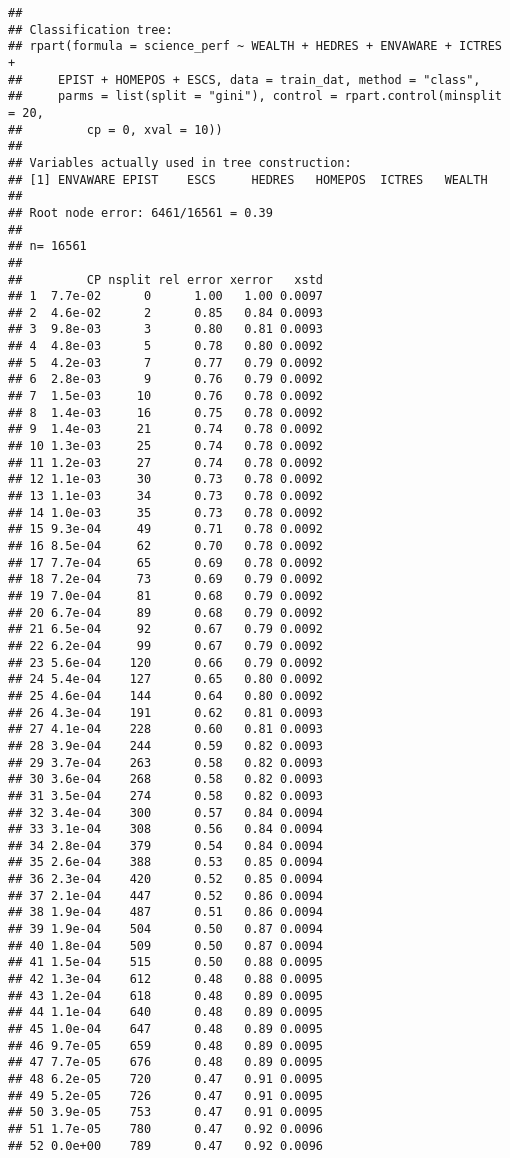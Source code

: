 \documentclass[
]{book}
\begin{document}
\begin{verbatim}
## 
## Classification tree:
## rpart(formula = science_perf ~ WEALTH + HEDRES + ENVAWARE + ICTRES + 
##     EPIST + HOMEPOS + ESCS, data = train_dat, method = "class", 
##     parms = list(split = "gini"), control = rpart.control(minsplit = 20, 
##         cp = 0, xval = 10))
## 
## Variables actually used in tree construction:
## [1] ENVAWARE EPIST    ESCS     HEDRES   HOMEPOS  ICTRES   WEALTH  
## 
## Root node error: 6461/16561 = 0.39
## 
## n= 16561 
## 
##         CP nsplit rel error xerror   xstd
## 1  7.7e-02      0      1.00   1.00 0.0097
## 2  4.6e-02      2      0.85   0.84 0.0093
## 3  9.8e-03      3      0.80   0.81 0.0093
## 4  4.8e-03      5      0.78   0.80 0.0092
## 5  4.2e-03      7      0.77   0.79 0.0092
## 6  2.8e-03      9      0.76   0.79 0.0092
## 7  1.5e-03     10      0.76   0.78 0.0092
## 8  1.4e-03     16      0.75   0.78 0.0092
## 9  1.4e-03     21      0.74   0.78 0.0092
## 10 1.3e-03     25      0.74   0.78 0.0092
## 11 1.2e-03     27      0.74   0.78 0.0092
## 12 1.1e-03     30      0.73   0.78 0.0092
## 13 1.1e-03     34      0.73   0.78 0.0092
## 14 1.0e-03     35      0.73   0.78 0.0092
## 15 9.3e-04     49      0.71   0.78 0.0092
## 16 8.5e-04     62      0.70   0.78 0.0092
## 17 7.7e-04     65      0.69   0.78 0.0092
## 18 7.2e-04     73      0.69   0.79 0.0092
## 19 7.0e-04     81      0.68   0.79 0.0092
## 20 6.7e-04     89      0.68   0.79 0.0092
## 21 6.5e-04     92      0.67   0.79 0.0092
## 22 6.2e-04     99      0.67   0.79 0.0092
## 23 5.6e-04    120      0.66   0.79 0.0092
## 24 5.4e-04    127      0.65   0.80 0.0092
## 25 4.6e-04    144      0.64   0.80 0.0092
## 26 4.3e-04    191      0.62   0.81 0.0093
## 27 4.1e-04    228      0.60   0.81 0.0093
## 28 3.9e-04    244      0.59   0.82 0.0093
## 29 3.7e-04    263      0.58   0.82 0.0093
## 30 3.6e-04    268      0.58   0.82 0.0093
## 31 3.5e-04    274      0.58   0.82 0.0093
## 32 3.4e-04    300      0.57   0.84 0.0094
## 33 3.1e-04    308      0.56   0.84 0.0094
## 34 2.8e-04    379      0.54   0.84 0.0094
## 35 2.6e-04    388      0.53   0.85 0.0094
## 36 2.3e-04    420      0.52   0.85 0.0094
## 37 2.1e-04    447      0.52   0.86 0.0094
## 38 1.9e-04    487      0.51   0.86 0.0094
## 39 1.9e-04    504      0.50   0.87 0.0094
## 40 1.8e-04    509      0.50   0.87 0.0094
## 41 1.5e-04    515      0.50   0.88 0.0095
## 42 1.3e-04    612      0.48   0.88 0.0095
## 43 1.2e-04    618      0.48   0.89 0.0095
## 44 1.1e-04    640      0.48   0.89 0.0095
## 45 1.0e-04    647      0.48   0.89 0.0095
## 46 9.7e-05    659      0.48   0.89 0.0095
## 47 7.7e-05    676      0.48   0.89 0.0095
## 48 6.2e-05    720      0.47   0.91 0.0095
## 49 5.2e-05    726      0.47   0.91 0.0095
## 50 3.9e-05    753      0.47   0.91 0.0095
## 51 1.7e-05    780      0.47   0.92 0.0096
## 52 0.0e+00    789      0.47   0.92 0.0096
\end{verbatim}
\end{document}

